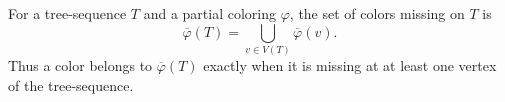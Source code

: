 \begin{definition}
For a tree-sequence $T$ and a partial coloring $\varphi$, the set of colors
missing on $T$ is
\[
 \overline\varphi(T)=\bigcup_{v\in V(T)}\overline\varphi(v).
\]
Thus a color belongs to $\overline\varphi(T)$ exactly when it is missing at
at least one vertex of the tree-sequence.
\end{definition}
